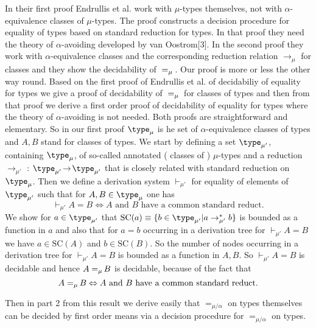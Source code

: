 \documentclass[11pt,aslarticle,xperspectives,bibay3]{asl}
\newcommand\redmu{\mathrel{\rightarrow_{\mu}}}
\newcommand\redmua{\mathrel{\rightarrow_{\mu'}}}
\newcommand\redmuastar{\mathrel{\rightarrow^{\ast}_{\mu'}}}
\newcommand\tamua{\type_{\mu'}}
\newcommand\prmua{\vdash_{\mu'}}
\newcommand\weakmualphaeq{=_{\mu/\alpha}}
\newcommand\SC{{\mbox {SC}}}
\begin{document}
{\begin{Introduction}
\newline In their first proof Endrullis et al. work with $\mu$-types themselves, not with $\alpha$-equivalence  classes of $\mu$-types. The proof constructs a decision procedure for equality of types based on standard reduction for types. In that proof they need the theory of $\alpha$-avoiding developed by van Oostrom[3]. In the second proof they work with $\alpha$-equivalence classes  and the corresponding reduction relation $\redmu$ for classes and they show the decidability of ${\; =_{\mu} \,}$. Our proof is more or less the other way round. Based on the first proof of Endrullis et al. of decidabiliy of equality for types we give a proof of decidability of ${\; =_{\mu} \,}$ for classes of types and then from that proof we derive a first order proof of decidability of equality for types where the theory of $\alpha$-avoiding is not needed. Both proofs are straightforward and elementary.
\newline So in our first proof $\tamu$ is he set of $\alpha$-equivalence classes of types and  $A, B$ stand for classes of types. We start by defining a set $\tamua$, containing $\tamu$, of so-called annotated ( classes of ) $\mu$-types and a reduction $\redmua$ : $\tamua \to \tamua$ that is closely related with standard reduction on $\tamu$. Then we define a derivation system $\prmua$ for equality of elements of $\tamua$ such that for $A,B\in \tamu$ one has 
$$\prmua A = B \Leftrightarrow A \mbox{ and } B \mbox{ have a common standard reduct.}$$
We show for $a\in\tamua$ that $\SC(a) \equiv \{b\in\tamua | a\redmuastar b\}$ is bounded as a function in $a$ and also that for $ a = b$ occurring in a derivation tree for $\prmua A = B$ we have $a\in\SC(A)$ and $b\in \SC(B).$ So  the number of nodes occurring in a derivation tree for  $\prmua A = B$ is bounded as a function in $A,B.$ So $\prmua A = B$ is decidable and hence $A{\; =_{\mu} \,} B$ is decidable, because of  the fact that 
$$A{\; =_{\mu} \,} B  \Leftrightarrow A \mbox{ and } B \mbox{ have a common standard reduct.}$$

Then in part 2 from this result we derive easily that $\weakmualphaeq$ on  types themselves can be decided by first order means via a decision procedure for $\weakmualphaeq$ on types. 

\end{Introduction}
}
\end{document}

